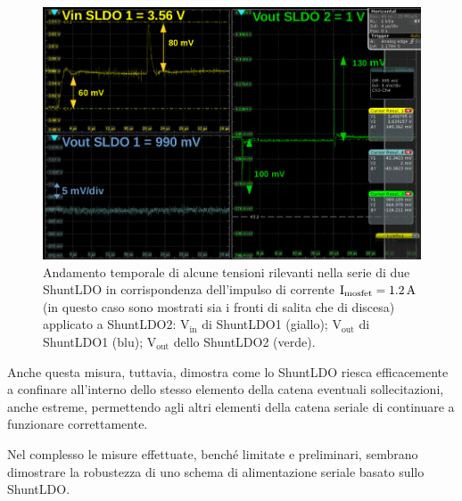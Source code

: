 \begin{figure}[h!]
\centering
\includegraphics[scale=.32]{Immagini/ScreenSerie}
\caption{Andamento temporale di alcune tensioni rilevanti nella serie di due ShuntLDO in corrispondenza dell'impulso di corrente $\mathrm{I_{mosfet}} = 1.2 \rm \, A$ (in questo caso sono mostrati sia i fronti di salita che di discesa) applicato a ShuntLDO2: $\mathrm{V_{in}}$ di ShuntLDO1 (giallo); $\mathrm{V_{out}}$ di ShuntLDO1 (blu); $\mathrm{V_{out}}$ dello ShuntLDO2 (verde).}
\label{ScreenSerie}
\end{figure}
Anche questa misura, tuttavia, dimostra come lo ShuntLDO riesca efficacemente a confinare all'interno dello stesso elemento della catena eventuali sollecitazioni, anche estreme, permettendo agli altri elementi della catena seriale di continuare a funzionare correttamente.

Nel complesso le misure effettuate, bench\'e limitate e preliminari, sembrano dimostrare la robustezza di uno schema di alimentazione seriale basato sullo ShuntLDO.
